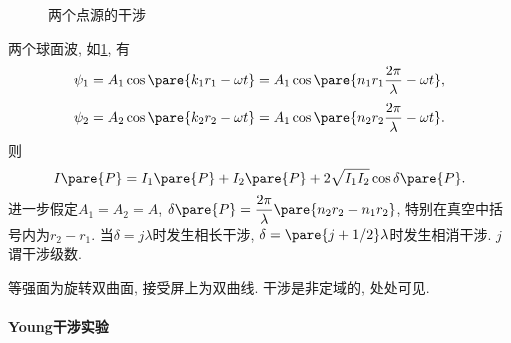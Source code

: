 \documentclass{ctexart}
\begin{document}
\begin{figure}
    \centering
    \caption{两个点源的干涉}
    \label{fig:两个点源的干涉}
\end{figure}
两个球面波, 如\cref{fig:两个点源的干涉}, 有
\[ \psi_1 = A_1\cos\pare{k_1 r_1 - \omega t} = A_1 \cos\pare{n_1 r_1 \frac{2\pi}{\lambda}-\omega t}, \]
\[ \psi_2 = A_2\cos\pare{k_2 r_2 - \omega t} = A_1 \cos\pare{n_2 r_2 \frac{2\pi}{\lambda}-\omega t}. \]
则
\[ I\pare{P} = I_1\pare{P} + I_2\pare{P} + 2\sqrt{I_1 I_2}\cos\delta\pare{P}. \]
进一步假定$A_1 = A_2 = A$, $\delta \pare{P} = \displaystyle \frac{2\pi}{\lambda}\pare{n_2 r_2 - n_1 r_2}$, 特别在真空中括号内为$r_2 - r_1$. 当$\delta = j\lambda$时发生相长干涉, $\delta = \pare{j+1/2}\lambda$时发生相消干涉. $j$谓干涉级数.
\par
等强面为旋转双曲面, 接受屏上为双曲线. 干涉是非定域的, 处处可见.

\paragraph{Young干涉实验} %
\label{par:young干涉实验}
\end{document}
